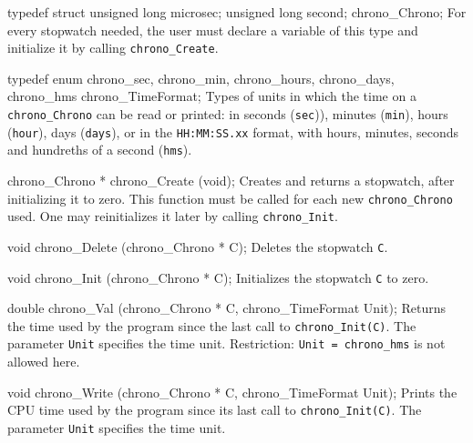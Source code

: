 \iffalse  %
  Even though the ANSI/ISO macro {\tt CLOCKS\_PER\_SEC = 1000000} 
  is the number of clock ticks per second for the value
  returned by the {\tt clock} function (so this function returns the
  number of microseconds), on some systems where the 32-bit type {\tt long} 
  is used to measure time, the value returned by {\tt clock}
  wraps around to negative values after about 36 minutes.
  On some other systems where time is measured using the 32-bit type
  {\tt unsigned long}, the clock may wrap around to 0 after about 72 minutes.
\fi  %

\code
\iffalse
/* chrono.h for ANSI C */

#ifndef CHRONO_H
#define CHRONO_H 
#include "gdef.h"
\fi
\endcode

\newpage
\code

typedef struct {
   unsigned long microsec;
   unsigned long second;
   } chrono_Chrono;
\endcode
  \tab
   For every stopwatch needed, the user must declare a variable of
   this type and initialize it by calling {\tt chrono\_Create}.
  \endtab
\code

typedef enum {
   chrono_sec,
   chrono_min,
   chrono_hours, 
   chrono_days,
   chrono_hms
   } chrono_TimeFormat;
\endcode
 \tab
  Types of units in which the time on a {\tt chrono\_Chrono} can be 
  read or printed:
  in seconds ({\tt sec})), minutes ({\tt min}), hours ({\tt hour}), days
  ({\tt days}), or in the {\tt HH:MM:SS.xx} format, with hours, 
  minutes, seconds and hundreths of a second ({\tt hms}).
 \endtab


\code

chrono_Chrono * chrono_Create (void);
\endcode
  \tab
   Creates and returns a stopwatch, after initializing it to zero. This
   function must be called for each new {\tt chrono\_Chrono} used.
   One may reinitializes it later by calling {\tt chrono\_Init}.
  \endtab
\code

void chrono_Delete (chrono_Chrono * C);
\endcode
  \tab
   Deletes the stopwatch {\tt C}.
  \endtab
\code

void chrono_Init (chrono_Chrono * C);
\endcode
  \tab
  Initializes the stopwatch {\tt C} to zero.
  \endtab
\code

double chrono_Val (chrono_Chrono * C, chrono_TimeFormat Unit);
\endcode
  \tab
  Returns the time used by the program since the last call to
  {\tt chrono\_Init(C)}. The parameter {\tt Unit} specifies the time unit.
  Restriction: {\tt Unit = chrono\_hms} is not allowed here.
  \endtab
\code

void chrono_Write (chrono_Chrono * C, chrono_TimeFormat Unit);
\endcode
 \tab
  Prints the CPU time used by the program since its last
  call to {\tt chrono\_Init(C)}.
  The parameter {\tt Unit} specifies the time unit.
 \endtab
\code
\iffalse
#endif
\fi\endcode
